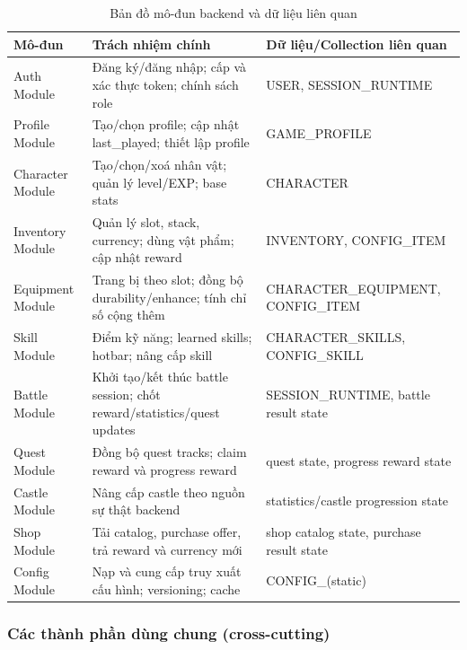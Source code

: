 \begin{table}[H]
\centering
\renewcommand{\arraystretch}{1.2}
\setlength{\tabcolsep}{6pt}
\begin{tabularx}{\textwidth}{|L{3.25cm}|Y|L{4.1cm}|}
\hline
\textbf{Mô-đun} & \textbf{Trách nhiệm chính} & \textbf{Dữ liệu/\allowbreak Collection liên quan} \\
\hline
Auth Module & Đăng ký/\allowbreak đăng nhập; cấp và xác thực token; chính sách role & USER, SESSION\_\allowbreak RUNTIME \\
\hline
Profile Module & Tạo/\allowbreak chọn profile; cập nhật last\_played; thiết lập profile & GAME\_\allowbreak PROFILE \\
\hline
Character Module & Tạo/\allowbreak chọn/\allowbreak xoá nhân vật; quản lý level/\allowbreak EXP; base stats & CHARACTER \\
\hline
Inventory Module & Quản lý slot, stack, currency; dùng vật phẩm; cập nhật reward & INVENTORY, CONFIG\_\allowbreak ITEM \\
\hline
Equipment Module & Trang bị theo slot; đồng bộ durability/\allowbreak enhance; tính chỉ số cộng thêm & CHARACTER\_\allowbreak EQUIPMENT, CONFIG\_\allowbreak ITEM \\
\hline
Skill Module & Điểm kỹ năng; learned skills; hotbar; nâng cấp skill & CHARACTER\_\allowbreak SKILLS, CONFIG\_\allowbreak SKILL \\
\hline
Battle Module & Khởi tạo/\allowbreak kết thúc battle session; chốt reward/\allowbreak statistics/\allowbreak quest updates & SESSION\_\allowbreak RUNTIME, battle result state \\
\hline
Quest Module & Đồng bộ quest tracks; claim reward và progress reward & quest state, progress reward state \\
\hline
Castle Module & Nâng cấp castle theo nguồn sự thật backend & statistics/\allowbreak castle progression state \\
\hline
Shop Module & Tải catalog, purchase offer, trả reward và currency mới & shop catalog state, purchase result state \\
\hline
Config Module & Nạp và cung cấp truy xuất cấu hình; versioning; cache & CONFIG\_\allowbreak * (static) \\
\hline
\end{tabularx}
\caption{Bản đồ mô-đun backend và dữ liệu liên quan}
\label{tab:module-map}
\end{table}

\subsubsection{Các thành phần dùng chung (cross-cutting)}
\label{subsubsec:design-crosscutting}

